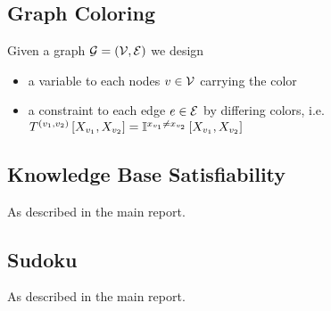 \documentclass[aps,onecolumn,nofootinbib,pra]{article}
\begin{document}
\subsection{Graph Coloring}

Given a graph $\mathcal{G}=(\mathcal{V},\mathcal{E})$ we design
\begin{itemize}
	\item a variable to each nodes $v\in\mathcal{V}$ carrying the color
	\item a constraint to each edge $e\in\mathcal{E}$ by differing colors, i.e. $T^{(v_1,v_2)}\left[X_{v_1},X_{v_2}\right] = \mathbb{I}^{x_{v_1}\neq x_{v_2}}\left[X_{v_1},X_{v_2}\right] $
\end{itemize}

\subsection{Knowledge Base Satisfiability}

As described in the main report.

\subsection{Sudoku}

As described in the main report.
\end{document}
